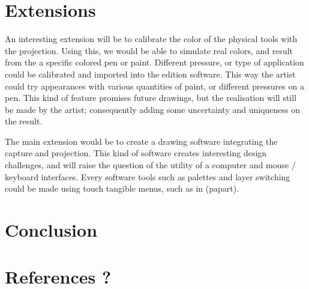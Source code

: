 \documentclass{article}
\begin{document}
\section{Extensions}

An interesting extension will be to calibrate the color of the physical tools with the projection. Using this, we would be able to simulate real colors, and result from the a specific colored pen or paint. Different pressure, or type of application could be calibrated and imported into the edition software. This way the artist could try appearances with various quantities of paint, or different pressures on a pen. This kind of feature promises future drawings, but the realisation will still be made by the artist; consequently adding some uncertainty and uniqueness on the result. 

The main extension would be to create a drawing software integrating the capture and projection. This kind of software creates interesting design challenges, and will raise the question of the utility of a computer and mouse / keyboard interfaces. Every software tools such as palettes and layer switching could be made using touch tangible menus, such as in (papart). 

\section{Conclusion}





\section{References ?}
\end{document}
